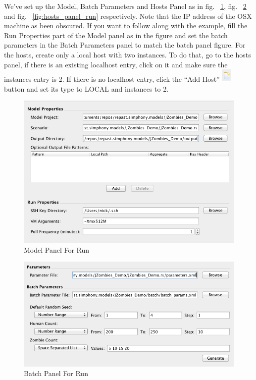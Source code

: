 \documentclass[11pt]{amsart}
\begin{document}
We've set up the Model, Batch Parameters and Hosts Panel as in fig. ~\ref{fig:model_panel_run}, fig. ~\ref{fig:batch_panel_run} and fig. ~\ref{fig:hosts_panel_run} respectively. Note that the IP address of the OSX machine as been obscured. If you want to follow along with the example, fill the Run Properties part of the Model panel as in the figure and set the batch parameters in the Batch Parameters panel to match the batch panel figure. For the hosts, create only a local host with two instances. To do that, go to the hosts panel, if there is an existing localhost entry, click on it and make sure the instances entry is 2. If there is no localhost entry, click the ``Add Host'' \includegraphics[height=.2in]{images/add_host.png} button and set its type to LOCAL and instances to 2. 

\begin{figure}[h]
\begin{center}
\vspace{.2in}
\centerline {
\includegraphics[width=6in]{images/model_panel_run.png}
}
\caption{Model Panel For Run}
\label{fig:model_panel_run}
\end{center}
\end{figure}

\begin{figure}[h]
\begin{center}
\vspace{.2in}
\centerline {
\includegraphics[width=6in]{images/batch_panel_run.png}
}
\caption{Batch Panel For Run}
\label{fig:batch_panel_run}
\end{center}
\end{figure}
\end{document}
